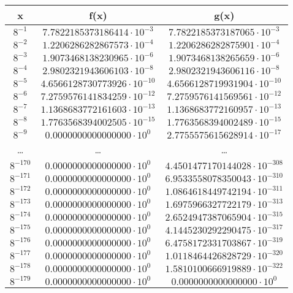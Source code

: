 \documentclass{article}
\begin{document}
\begin{table}[h!]
    \centering
    \begin{tabular}{|c|c|c|}
        \hline
        x & f(x) & g(x) \\
        \hline
        $8^{-1}$ & $7.7822185373186414 \cdot 10^{-3}$ & $7.7822185373187065 \cdot 10^{-3}$ \\
        \hline
        $8^{-2}$ & $1.2206286282867573 \cdot 10^{-4}$ & $1.2206286282875901 \cdot 10^{-4}$ \\
        \hline
        $8^{-3}$ & $1.9073468138230965 \cdot 10^{-6}$ & $1.9073468138265659 \cdot 10^{-6}$ \\
        \hline
        $8^{-4}$ & $2.9802321943606103 \cdot 10^{-8}$ & $2.9802321943606116 \cdot 10^{-8}$ \\
        \hline
        $8^{-5}$ & $4.6566128730773926 \cdot 10^{-10}$ & $4.6566128719931904 \cdot 10^{-10}$ \\
        \hline
        $8^{-6}$ & $7.2759576141834259 \cdot 10^{-12}$ & $7.2759576141569561 \cdot 10^{-12}$ \\
        \hline
        $8^{-7}$ & $1.1368683772161603 \cdot 10^{-13}$ & $1.1368683772160957 \cdot 10^{-13}$ \\
        \hline
        $8^{-8}$ & $1.7763568394002505 \cdot 10^{-15}$ & $1.7763568394002489 \cdot 10^{-15}$ \\
        \hline
        $8^{-9}$ & $0.0000000000000000 \cdot 10^{0}$ & $2.7755575615628914 \cdot 10^{-17}$ \\
        \hline
        \dots & \dots & \dots \\
        \hline
        $8^{-170}$ & $0.0000000000000000 \cdot 10^{0}$ & $4.4501477170144028 \cdot 10^{-308}$ \\
        \hline
        $8^{-171}$ & $0.0000000000000000 \cdot 10^{0}$ & $6.9533558078350043 \cdot 10^{-310}$ \\
        \hline
        $8^{-172}$ & $0.0000000000000000 \cdot 10^{0}$ & $1.0864618449742194 \cdot 10^{-311}$ \\
        \hline
        $8^{-173}$ & $0.0000000000000000 \cdot 10^{0}$ & $1.6975966327722179 \cdot 10^{-313}$ \\
        \hline
        $8^{-174}$ & $0.0000000000000000 \cdot 10^{0}$ & $2.6524947387065904 \cdot 10^{-315}$ \\
        \hline
        $8^{-175}$ & $0.0000000000000000 \cdot 10^{0}$ & $4.1445230292290475 \cdot 10^{-317}$ \\
        \hline
        $8^{-176}$ & $0.0000000000000000 \cdot 10^{0}$ & $6.4758172331703867 \cdot 10^{-319}$ \\
        \hline
        $8^{-177}$ & $0.0000000000000000 \cdot 10^{0}$ & $1.0118464426828729 \cdot 10^{-320}$ \\
        \hline
        $8^{-178}$ & $0.0000000000000000 \cdot 10^{0}$ & $1.5810100666919889 \cdot 10^{-322}$ \\
        \hline
        $8^{-179}$ & $0.0000000000000000 \cdot 10^{0}$ & $0.0000000000000000 \cdot 10^{0}$ \\
        \hline
    \end{tabular}
    \label{tab:f_g}
\end{table}\\
\end{document}
